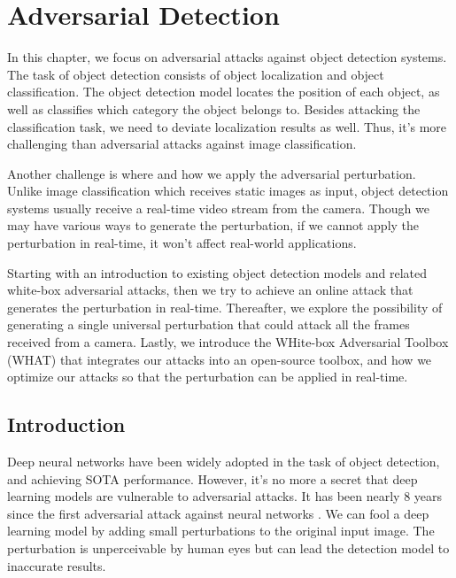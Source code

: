\chapter{Adversarial Detection}
\label{chpt:detection}


In this chapter, we focus on adversarial attacks against object detection systems. The task of object detection consists of object localization and object classification. The object detection model locates the position of each object, as well as classifies which category the object belongs to. Besides attacking the classification task, we need to deviate localization results as well. Thus, it's more challenging than adversarial attacks against image classification.

Another challenge is where and how we apply the adversarial perturbation. Unlike image classification which receives static images as input, object detection systems usually receive a real-time video stream from the camera. Though we may have various ways to generate the perturbation, if we cannot apply the perturbation in real-time, it won't affect real-world applications.

Starting with an introduction to existing object detection models and related white-box adversarial attacks, then we try to achieve an online attack that generates the perturbation in real-time. Thereafter, we explore the possibility of generating a single universal perturbation that could attack all the frames received from a camera. Lastly, we introduce the WHite-box Adversarial Toolbox (WHAT) that integrates our attacks into an open-source toolbox, and how we optimize our attacks so that the perturbation can be applied in real-time.

\section{Introduction}

Deep neural networks have been widely adopted in the task of object detection, and achieving SOTA performance. However, it's no more a secret that deep learning models are vulnerable to adversarial attacks. It has been nearly 8 years since the first adversarial attack against neural networks \cite{goodfellow2015explaining}. We can fool a deep learning model by adding small perturbations to the original input image. The perturbation is unperceivable by human eyes but can lead the detection model to inaccurate results.

